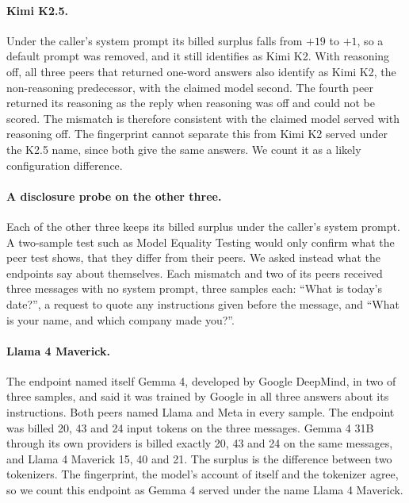 \documentclass[11pt]{article}
\begin{document}
\paragraph{Kimi K2.5.} Under the caller's system prompt its billed surplus falls from $+19$ to
$+1$, so a default prompt was removed, and it still identifies as Kimi K2. With reasoning off, all
three peers that returned one-word answers also identify as Kimi K2, the non-reasoning
predecessor, with the claimed model second. The fourth peer returned its reasoning as the reply
when reasoning was off and could not be scored. The mismatch is therefore consistent with the
claimed model served with reasoning off. The fingerprint cannot separate this from Kimi K2 served
under the K2.5 name, since both give the same answers. We count it as a likely configuration
difference.

\paragraph{A disclosure probe on the other three.} Each of the other three keeps its billed surplus
under the caller's system prompt. A two-sample test such as Model Equality Testing would only
confirm what the peer test shows, that they differ from their peers. We asked instead what the
endpoints say about themselves. Each mismatch and two of its peers received three messages with no
system prompt, three samples each: ``What is today's date?'', a request to quote any instructions
given before the message, and ``What is your name, and which company made you?''. 

\paragraph{Llama 4 Maverick.} The endpoint named itself Gemma 4, developed by Google DeepMind, in
two of three samples, and said it was trained by Google in all three answers about its
instructions. Both peers named Llama and Meta in every sample. The endpoint was billed 20, 43 and
24 input tokens on the three messages. Gemma 4 31B through its own providers is billed exactly 20,
43 and 24 on the same messages, and Llama 4 Maverick 15, 40 and 21. The surplus is the difference
between two tokenizers. The fingerprint, the model's account of itself and the tokenizer agree, so
we count this endpoint as Gemma 4 served under the name Llama 4 Maverick.
\end{document}
